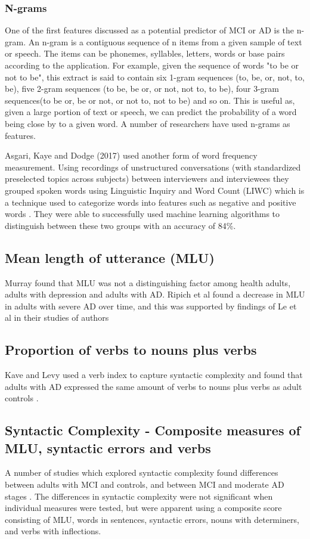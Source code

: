 \documentclass[10pt, letterpaper, twoside, openany]{book}
\begin{document}
\subsubsection{N-grams}
One of the first features discussed as a potential predictor of MCI or AD is the n-gram. An n-gram is a contiguous sequence of n items from a given sample of text or speech. The items can be phonemes, syllables, letters, words or base pairs according to the application. For example, given the sequence of words "to be or not to be", this extract is said to contain six 1-gram sequences (to, be, or, not, to, be), five 2-gram sequences (to be, be or, or not, not to, to be), four 3-gram sequences(to be or, be or not, or not to, not to be) and so on. This is useful as, given a large portion of text or speech, we can predict the probability of a word being close by to a given word. A number of researchers have used n-grams as features. 
\par
Asgari, Kaye and Dodge (2017) \cite{Asgari2017} used another form of word frequency measurement. Using recordings of unstructured conversations (with standardized preselected topics across subjects) between interviewers and interviewees they grouped spoken words using Linguistic Inquiry and Word Count (LIWC) which is a technique used to categorize words into features such as negative and positive words \cite{Pennebaker2015}. They were able to successfully used machine learning algorithms to distinguish between these two groups with an accuracy of 84\%. 
\par
\subsection{Mean length of utterance (MLU)}
Murray found that MLU was not a distinguishing factor among health adults, adults with depression and adults with AD. Ripich et al found a decrease in MLU in adults with severe AD over time, and this was supported by findings of Le et al in their studies of authors \cite{Ripich1988, Le2011}
\par
\subsection{Proportion of verbs to nouns plus verbs}
Kave and Levy used a verb index to capture syntactic complexity and found that adults with AD expressed the same amount of verbs to nouns plus verbs as adult controls \cite{Kave2018}.
\par
\subsection{Syntactic Complexity - Composite measures of MLU, syntactic errors and verbs}
A number of studies which explored syntactic complexity found differences between adults with MCI and controls, and between MCI and moderate AD stages \cite{Rentoumi2014, Ahmed2013}. The differences in syntactic complexity were not significant when individual measures were tested, but were apparent using a composite score consisting of MLU, words in sentences, syntactic errors, nouns with determiners, and verbs with inflections.
\par
\end{document}
